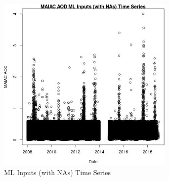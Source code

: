 \begin{figure} 
\centering  
\includegraphics[width=0.77\textwidth]{Code_Outputs/Report_ML_input_PM25_Step4_part_e_de_duplicated_aveswNAs_MAIAC_AODvDate.jpg} 
\caption{\label{fig:Report_ML_input_PM25_Step4_part_e_de_duplicated_aveswNAsMAIAC_AODvDate}ML Inputs (with NAs) Time Series} 
\end{figure} 
 

